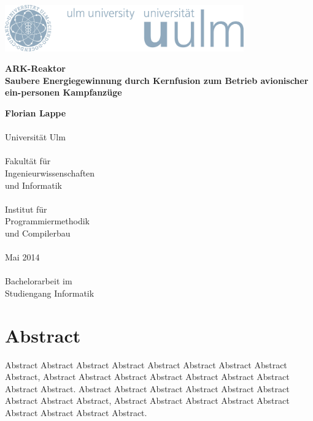 \documentclass[a4paper,10pt
headsepline,           %
doubleside,            %
pointlessnumbers,      %
bibtotoc,              %
BCOR15mm,               %
leqno					%
]{scrbook}
\newcommand{\fullname}{Florian Lappe}
\newcommand{\titel}{ARK-Reaktor}
\newcommand{\untertitel}{Saubere Energiegewinnung durch Kernfusion zum Betrieb avionischer ein-personen Kampfanzüge}
\newcommand{\abgabedatum}{Mai 2014}
\newcommand{\abschlussarbeit}{Bachelorarbeit}
\begin{document}
\frontmatter %


\begin{titlepage}
	\selectfont %
	\hfill\includegraphics[height=2.0cm]{images/logo_100_sRGB}\\[3.5cm] %
	\begin{flushright}
		\Huge \textbf{\titel}\\[0.2cm]
		\fontsize{19}{20}\selectfont \textbf{\untertitel}\\
	\end{flushright}
	
	\vfill\hfill
	\parbox[t]{4.6cm}{
		\singlespacing
		\large
		\textbf{\fullname}\\
		\\
		Universität Ulm\\
		\\
		Fakultät für\\
		Ingenieurwissenschaften\\
		und Informatik\\
		\\
		Institut für\\
		Programmiermethodik\\
		und Compilerbau\\
		\\
		\abgabedatum\\
		\\
		{\abschlussarbeit} im\\
		Studiengang Informatik
	}
\end{titlepage}
\restoregeometry


\clearpage
\thispagestyle{empty}
\chapter*{Abstract}

Abstract Abstract Abstract Abstract Abstract Abstract Abstract Abstract Abstract,
Abstract Abstract Abstract Abstract Abstract Abstract Abstract Abstract Abstract.
Abstract Abstract Abstract Abstract Abstract Abstract Abstract Abstract Abstract,
Abstract Abstract Abstract Abstract Abstract Abstract Abstract Abstract Abstract.
\end{document}
